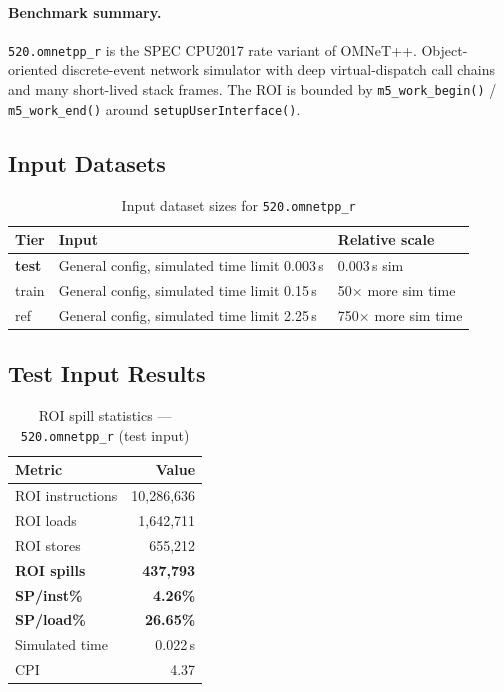 \documentclass[11pt,a4paper]{article}
\begin{document}
\paragraph{Benchmark summary.}
\texttt{520.omnetpp\_r} is the SPEC CPU2017 rate variant of OMNeT++.
Object-oriented discrete-event network simulator with deep virtual-dispatch call chains and many short-lived stack frames.
The ROI is bounded by \texttt{m5\_work\_begin()} / \texttt{m5\_work\_end()}
around \texttt{setupUserInterface()}.

\subsection{Input Datasets}

\begin{table}[H]
\centering
\caption{Input dataset sizes for \texttt{520.omnetpp\_r}}
\label{tab:omnetpp_inputs}
\small
\begin{tabular}{lp{8cm}l}
\toprule
\textbf{Tier} & \textbf{Input} & \textbf{Relative scale} \\
\midrule
\textbf{test} & General config, simulated time limit 0.003\,s & 0.003\,s sim \\
train & General config, simulated time limit 0.15\,s & 50$\times$ more sim time \\
ref & General config, simulated time limit 2.25\,s & 750$\times$ more sim time \\
\bottomrule
\end{tabular}
\end{table}

\subsection{Test Input Results}

\begin{table}[H]
\centering
\caption{ROI spill statistics --- \texttt{520.omnetpp\_r} (test input)}
\label{tab:omnetpp_test_roi}
\begin{tabular}{lr}
\toprule
\textbf{Metric} & \textbf{Value} \\
\midrule
ROI instructions & 10,286,636 \\
ROI loads        & 1,642,711 \\
ROI stores       & 655,212 \\
\textbf{ROI spills}   & \textbf{437,793} \\
\textbf{SP/inst\%}   & \textbf{4.26\%} \\
\textbf{SP/load\%}   & \textbf{26.65\%} \\
Simulated time   & 0.022\,s \\
CPI              & 4.37 \\
\bottomrule
\end{tabular}
\end{table}
\end{document}
